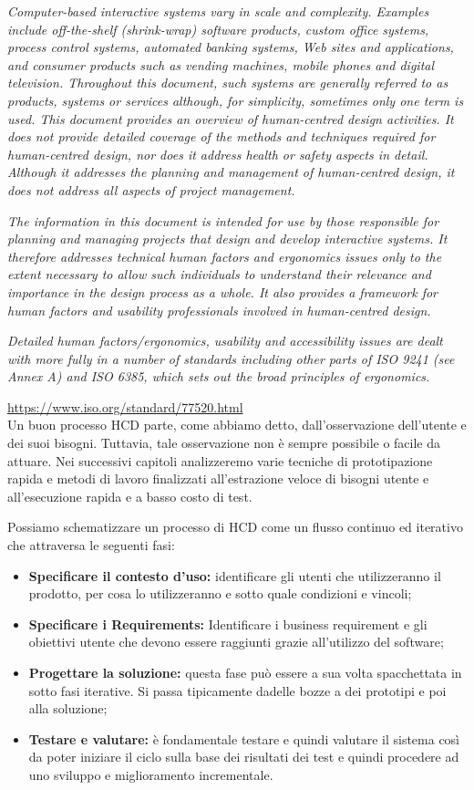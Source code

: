 \textit{Computer-based interactive systems vary in scale and complexity. Examples include off-the-shelf (shrink-wrap) software products, custom office systems, process control systems, automated banking systems, Web sites and applications, and consumer products such as vending machines, mobile phones and digital television. Throughout this document, such systems are generally referred to as products, systems or services although, for simplicity, sometimes only one term is used. This document provides an overview of human-centred design activities. It does not provide detailed coverage of the methods and techniques required for human-centred design, nor does it address health or safety aspects in detail. Although it addresses the planning and management of human-centred design, it does not address all aspects of project management. }

\textit{The information in this document is intended for use by those responsible for planning and managing projects that design and develop interactive systems. It therefore addresses technical human factors and ergonomics issues only to the extent necessary to allow such individuals to understand their relevance and importance in the design process as a whole. It also provides a framework for human factors and usability professionals involved in human-centred design.}

\textit{Detailed human factors/ergonomics, usability and accessibility issues are dealt with more fully in a number of standards including other parts of ISO 9241 (see Annex A) and ISO 6385, which sets out the broad principles of ergonomics.}

\url{https://www.iso.org/standard/77520.html}\\

Un buon processo HCD parte, come abbiamo detto, dall'osservazione dell'utente e dei suoi bisogni. Tuttavia, tale osservazione non è sempre possibile o facile da attuare. Nei successivi capitoli analizzeremo varie tecniche di prototipazione rapida e metodi di lavoro finalizzati all'estrazione veloce di bisogni utente e all'esecuzione rapida e a basso costo di test. 

Possiamo schematizzare un processo di HCD come un flusso continuo ed iterativo che attraversa le seguenti fasi: 
\begin{itemize}
    \item \textbf{Specificare il contesto d'uso:} identificare gli utenti che utilizzeranno il prodotto, per cosa lo utilizzeranno e sotto quale condizioni e vincoli;
    \item \textbf{Specificare i Requirements:} Identificare i business requirement e gli obiettivi utente che devono essere raggiunti grazie all'utilizzo del software;
    \item \textbf{Progettare la soluzione:} questa fase può essere a sua volta spacchettata in sotto fasi iterative. Si passa tipicamente dadelle bozze a dei prototipi e poi alla soluzione;
    \item \textbf{Testare e valutare:} è fondamentale testare e quindi valutare il sistema così da poter iniziare il ciclo sulla base dei risultati dei test e quindi procedere ad uno sviluppo e miglioramento incrementale.
\end{itemize}

